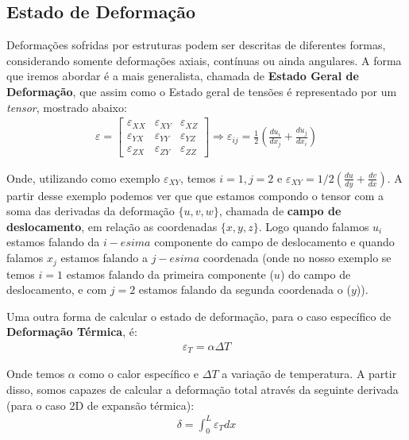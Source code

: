 \documentclass{article}
\begin{document}
\subsection{Estado de Deformação}
Deformações sofridas por estruturas podem ser descritas de diferentes formas, considerando somente deformações axiais, contínuas ou ainda angulares. A forma que iremos abordar é a mais generalista, chamada de \textbf{Estado Geral de Deformação}, que assim como o Estado geral de tensões é representado por um \emph{tensor}, mostrado abaixo:
\begin{align*}
    \varepsilon =  \begin{bmatrix}
                       \varepsilon_{XX} & \varepsilon_{XY} & \varepsilon_{XZ} \\
                       \varepsilon_{YX} & \varepsilon_{YY} & \varepsilon_{YZ} \\
                       \varepsilon_{ZX} & \varepsilon_{ZY} & \varepsilon_{ZZ}
                   \end{bmatrix}
    \Rightarrow \varepsilon_{ij} = \frac{1}{2}\left(\frac{du_i}{dx_j}+\frac{du_j}{dx_i}\right)
\end{align*}

Onde, utilizando como exemplo $\varepsilon_{XY}$, temos $i=1, j=2$ e $\varepsilon_{XY} = 1/2\left(\frac{du}{dy} + \frac{dv}{dx}\right)$. A partir desse exemplo podemos ver que que estamos compondo o tensor com a soma das derivadas da deformação $\{u, v, w\}$, chamada de \textbf{campo de deslocamento}, em relação as coordenadas $\{x, y, z\}$. Logo quando falamos $u_i$ estamos falando da $i-esima$ componente do campo de deslocamento e quando falamos $x_j$ estamos falando a $j-esima$ coordenada (onde no nosso exemplo se temos $i=1$ estamos falando da primeira componente ($u$) do campo de deslocamento, e com $j=2$ estamos falando da segunda coordenada o ($y$)).

Uma outra forma de calcular o estado de deformação, para o caso específico de \textbf{Deformação Térmica}, é:
\begin{align*}
    \varepsilon_T = \alpha \Delta T
\end{align*}

Onde temos $\alpha$ como o calor específico e $\Delta T$ a variação de temperatura. A partir disso, somos capazes de calcular a deformação total através da seguinte derivada (para o caso 2D de expansão térmica):
\begin{align*}
    \delta = \int^L_0 \varepsilon_T dx
\end{align*}
\end{document}
